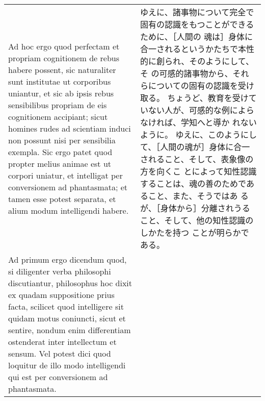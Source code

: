 \documentclass[10pt]{jsarticle} %
\begin{document}
\begin{longtable}{p{21em}p{21em}}
 Ad hoc ergo quod perfectam et
 propriam cognitionem de rebus habere possent, sic naturaliter sunt
 institutae ut corporibus uniantur, et sic ab ipsis rebus sensibilibus
 propriam de eis cognitionem accipiant; sicut homines rudes
 ad scientiam
 induci non possunt nisi per sensibilia exempla. Sic ergo patet quod
 propter melius animae est ut corpori uniatur, et intelligat per
 conversionem ad phantasmata; et tamen esse potest separata, et alium
 modum intelligendi habere.


&
ゆえに、諸事物について完全で固有の認識をもつことができるために、［人間の
 魂は］身体に合一されるというかたちで本性的に創られ、そのようにして、そ
 の可感的諸事物から、それらについての固有の認識を受け取る。
ちょうど、教育を受けていない人が、可感的な例によらなければ、学知へと導か
 れないように。
ゆえに、このようにして、［人間の魂が］身体に合一されること、そして、表象像の方を向くこ
 とによって知性認識することは、魂の善のためであること、また、そうではあ
 るが、［身体から］分離されうること、そして、他の知性認識のしかたを持つ
 ことが明らかである。


\\



Ad primum ergo dicendum quod, si diligenter
 verba philosophi discutiantur,
philosophus hoc dixit ex quadam
 suppositione prius facta, scilicet quod intelligere sit quidam motus
 coniuncti, sicut et sentire, nondum enim differentiam ostenderat inter
 intellectum et sensum. Vel potest dici quod loquitur de illo modo
 intelligendi qui est per conversionem ad phantasmata.


\end{longtable}
\end{document}
